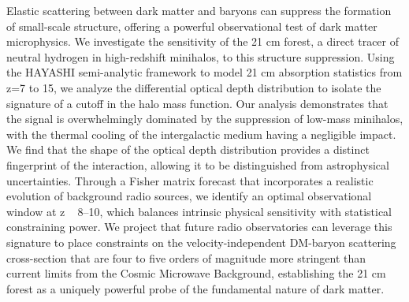 \documentclass[]{article}
\begin{document}
Elastic scattering between dark matter and baryons can suppress the formation of small-scale structure, offering a powerful observational test of dark matter microphysics. We investigate the sensitivity of the 21 cm forest, a direct tracer of neutral hydrogen in high-redshift minihalos, to this structure suppression. Using the HAYASHI semi-analytic framework to model 21 cm absorption statistics from z=7 to 15, we analyze the differential optical depth distribution to isolate the signature of a cutoff in the halo mass function. Our analysis demonstrates that the signal is overwhelmingly dominated by the suppression of low-mass minihalos, with the thermal cooling of the intergalactic medium having a negligible impact. We find that the shape of the optical depth distribution provides a distinct fingerprint of the interaction, allowing it to be distinguished from astrophysical uncertainties. Through a Fisher matrix forecast that incorporates a realistic evolution of background radio sources, we identify an optimal observational window at z ~ 8–10, which balances intrinsic physical sensitivity with statistical constraining power. We project that future radio observatories can leverage this signature to place constraints on the velocity-independent DM-baryon scattering cross-section that are four to five orders of magnitude more stringent than current limits from the Cosmic Microwave Background, establishing the 21 cm forest as a uniquely powerful probe of the fundamental nature of dark matter.
\end{document}
